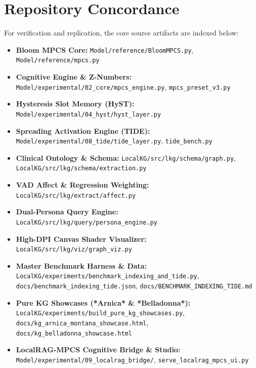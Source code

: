 \documentclass[10pt,twocolumn,letterpaper]{article}
\begin{document}
\section{Repository Concordance}
For verification and replication, the core source artifacts are indexed below:
\begin{itemize}
  \item \textbf{Bloom MPCS Core:} \texttt{Model/reference/BloomMPCS.py}, \texttt{Model/reference/mpcs.py}
  \item \textbf{Cognitive Engine \& Z-Numbers:} \texttt{Model/experimental/02\_core/mpcs\_engine.py}, \texttt{mpcs\_preset\_v3.py}
  \item \textbf{Hysteresis Slot Memory (HyST):} \texttt{Model/experimental/04\_hyst/hyst\_layer.py}
  \item \textbf{Spreading Activation Engine (TIDE):} \texttt{Model/experimental/08\_tide/tide\_layer.py}, \texttt{tide\_bench.py}
  \item \textbf{Clinical Ontology \& Schema:} \texttt{LocalKG/src/lkg/schema/graph.py}, \texttt{LocalKG/src/lkg/schema/extraction.py}
  \item \textbf{VAD Affect \& Regression Weighting:} \texttt{LocalKG/src/lkg/extract/affect.py}
  \item \textbf{Dual-Persona Query Engine:} \texttt{LocalKG/src/lkg/query/persona\_engine.py}
  \item \textbf{High-DPI Canvas Shader Visualizer:} \nolinkurl{LocalKG/src/lkg/viz/graph_viz.py}
  \item \textbf{Master Benchmark Harness \& Data:} \nolinkurl{LocalKG/experiments/benchmark_indexing_and_tide.py}, \nolinkurl{docs/benchmark_indexing_tide.json}, \nolinkurl{docs/BENCHMARK_INDEXING_TIDE.md}
  \item \textbf{Pure KG Showcases (*Arnica* \& *Belladonna*):} \nolinkurl{LocalKG/experiments/build_pure_kg_showcases.py}, \nolinkurl{docs/kg_arnica_montana_showcase.html}, \nolinkurl{docs/kg_belladonna_showcase.html}
  \item \textbf{LocalRAG-MPCS Cognitive Bridge \& Studio:} \nolinkurl{Model/experimental/09_localrag_bridge/}, \nolinkurl{serve_localrag_mpcs_ui.py}
\end{itemize}
\end{document}
